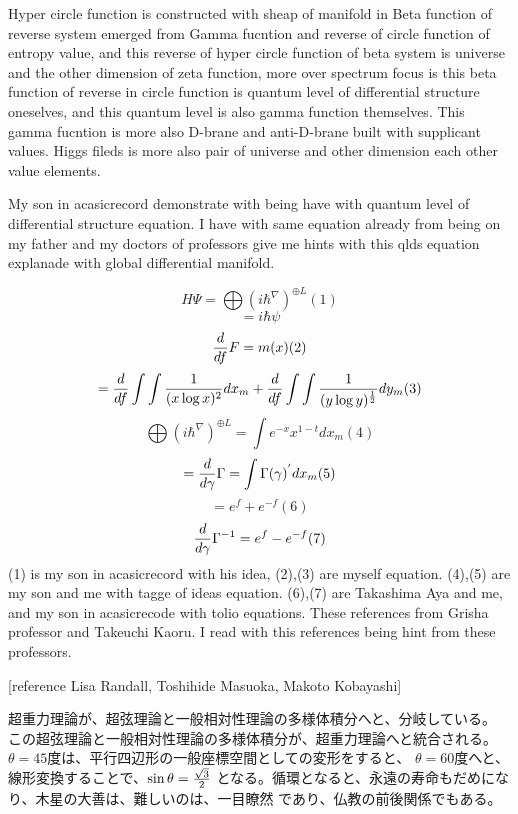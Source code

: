 \documentclass{jsarticle}
\begin{document}
    Hyper circle function is constructed with sheap of manifold in 
    Beta function of reverse system emerged from Gamma fucntion 
    and reverse of circle function of entropy value,
    and this reverse of hyper circle function of beta system
    is universe and the other dimension of zeta function,
    more over spectrum focus is this beta function of reverse in
    circle function is quantum level of differential structure oneselves,
    and this quantum level is also gamma function themselves.
    This gamma fucntion is more also D-brane and anti-D-brane built 
    with supplicant values. Higgs fileds is more also pair of universe and
    other dimension each other value elements. 


    My son in acasicrecord demonstrate with being have with quantum level
    of differential structure equation.
    I have with same equation already from being on 
    my father and my doctors of professors give me hints with 
    this qlds equation explanade with global differential manifold.

    $$ H\Psi = \bigoplus {(i \hbar^{\nabla})}^{\oplus L}  (1)$$
    $$ = i\hbar\psi $$
    $$ {d \over df}F = m(x) (2) $$
    $$ = {d \over df}\int \int{1 \over (x \log x)^2}dx_m
    + {d \over df}\int \int{1 \over (y \log y)^{1 \over 2}}dy_m  (3)$$
    $$  \bigoplus {(i \hbar^{\nabla})}^{\oplus L} = \int e^{-x}x^{1 - t}dx_m 
    (4)$$
    $$ = {d \over d \gamma}\Gamma = \int \Gamma(\gamma)^{'}dx_m (5)$$
    $$ = e^f + e^{-f} (6)$$
    $$ {d \over d \gamma}\Gamma^{-1} = e^{f} - e^{-f} (7)$$
    (1) is my son in acasicrecord with his idea, (2),(3) are myself equation.
    (4),(5) are my son and me with tagge of ideas equation.
    (6),(7) are Takashima Aya and me, and my son in acasicrecode with tolio
    equations.
    These references from Grisha professor and Takeuchi Kaoru.
    I read with this references being hint from these professors.
 
      [reference Lisa Randall, Toshihide Masuoka, Makoto Kobayashi]

 
       超重力理論が、超弦理論と一般相対性理論の多様体積分へと、分岐している。
       この超弦理論と一般相対性理論の多様体積分が、超重力理論へと統合される。
        $\theta = 45$度は、平行四辺形の一般座標空間としての変形をすると、
	$\theta = 60$度へと、線形変換することで、$\sin \theta = {\sqrt{3} \over 2}$
	となる。循環となると、永遠の寿命もだめになり、木星の大善は、難しいのは、一目瞭然
	であり、仏教の前後関係でもある。
\end{document}

